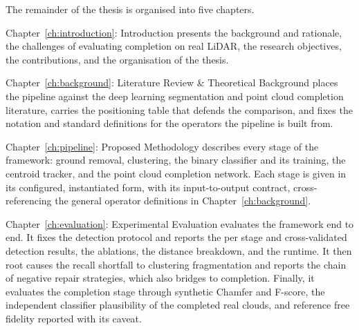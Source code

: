 \documentclass[a4paper,12pt]{report}
\begin{document}
The remainder of the thesis is organised into five chapters.

Chapter~\ref{ch:introduction}: Introduction presents the background and
rationale, the challenges of evaluating completion on real LiDAR, the research
objectives, the contributions, and the organisation of the thesis.

Chapter~\ref{ch:background}: Literature Review \& Theoretical Background
places the pipeline against the deep learning segmentation and point cloud completion
literature, carries the positioning table that defends the comparison, and fixes
the notation and standard definitions for the operators the pipeline is built from.

Chapter~\ref{ch:pipeline}: Proposed Methodology describes every stage of the
framework: ground removal, clustering, the binary classifier and its training, the
centroid tracker, and the point cloud completion network. Each stage is given in its
configured, instantiated form, with its input-to-output contract, cross-referencing the
general operator definitions in Chapter~\ref{ch:background}.

Chapter~\ref{ch:evaluation}: Experimental Evaluation evaluates the framework
end to end. It fixes the detection protocol and reports the per stage and
cross-validated detection results, the ablations, the distance breakdown, and the
runtime. It then root causes the recall shortfall to clustering fragmentation and
reports the chain of negative repair strategies, which also bridges to completion.
Finally, it evaluates the completion stage through synthetic Chamfer and F-score, the
independent classifier plausibility of the completed real clouds, and reference free
fidelity reported with its caveat.
\end{document}
